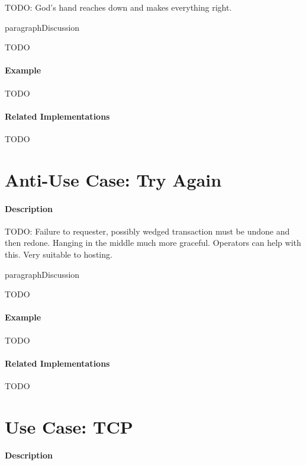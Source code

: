 {\Large TODO:} God's hand reaches down and makes everything right.

paragraph{Discussion}

{\Large TODO}

\paragraph{Example}

{\Large TODO}

\paragraph{Related Implementations}

{\Large TODO}

\section{Anti-Use Case: Try Again}

\paragraph{Description}

{\Large TODO:} Failure to requester, possibly wedged transaction must be undone and then redone.  Hanging in the middle much more graceful.  Operators can help with this.  Very suitable to hosting.

paragraph{Discussion}

{\Large TODO}

\paragraph{Example}

{\Large TODO}

\paragraph{Related Implementations}

{\Large TODO}

\section{Use Case: TCP}

\paragraph{Description}


